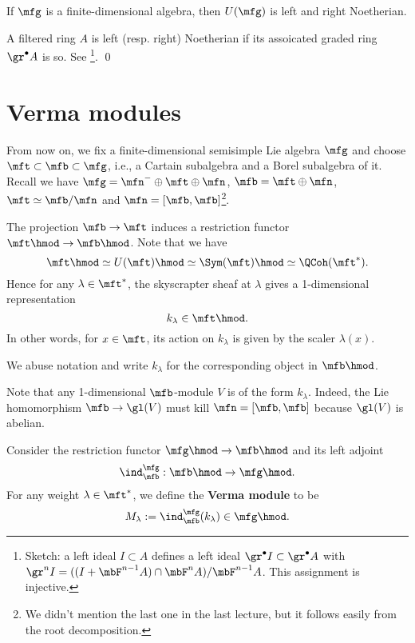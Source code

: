 \begin{cor}
	If $\mfg$ is a finite-dimensional algebra, then $U(\mfg)$ is left and right Noetherian. 
\end{cor}

\proof
	A filtered ring $A$ is left (resp. right) Noetherian if its assoicated graded ring $\gr^\bullet A$ is so. See \cite[Chapter 1, Theorem 6.9]{MR}\footnote{Sketch: a left ideal $I\subset A$ defines a left ideal $\gr^\bullet I\subset \gr^\bullet A$ with $\gr^n I= ((I + \mbF^{n-1}A) \cap \mbF^nA)/\mbF^{n-1}A$. This assignment is injective.}.
\qed

\section{Verma modules}

From now on, we fix a finite-dimensional semisimple Lie algebra $\mfg$ and choose $\mft\subset\mfb \subset \mfg$, i.e., a Cartain subalgebra and a Borel subalgebra of it. Recall we have $\mfg = \mfn^- \oplus \mft \oplus \mfn$, $\mfb = \mft\oplus \mfn$, $\mft\simeq \mfb/\mfn$ and $\mfn = [\mfb,\mfb]$\footnote{We didn't mention the last one in the last lecture, but it follows easily from the root decomposition.}.

\begin{constr}
	The projection $\mfb \to \mft$ induces a restriction functor $\mft\hmod \to \mfb\hmod$. Note that we have 
	\begin{equation} \label{eqn-Fourier}
		\mft\hmod \simeq U(\mft)\hmod \simeq \Sym(\mft)\hmod \simeq \QCoh(\mft^*).
	\end{equation}
	Hence for any $\lambda\in \mft^*$, the skyscrapter sheaf at $\lambda$ gives a 1-dimensional representation
	\[
		k_\lambda \in \mft\hmod.
	\]
	In other words, for $x\in \mft$, its action on $k_\lambda$ is given by the scaler $\lambda(x)$.

	We abuse notation and write $k_\lambda$ for the corresponding object in $\mfb\hmod$.
\end{constr}

\begin{rem}
	Note that any 1-dimensional $\mfb$-module $V$ is of the form $k_\lambda$. Indeed, the Lie homomorphism $\mfb \to \gl(V)$ must kill $\mfn=[\mfb,\mfb]$ because $\gl(V)$ is abelian.

\end{rem}

\begin{defn}
	Consider the restriction functor $\mfg\hmod \to \mfb\hmod$ and its left adjoint
	\[
		\ind_\mfb^\mfg: \mfb\hmod\to \mfg\hmod.
	\]
	For any weight $\lambda\in \mft^*$, we define the \textbf{Verma module} to be
	\[
		M_\lambda := \ind_\mfb^\mfg( k_\lambda ) \in \mfg\hmod.
	\]

\end{defn}

